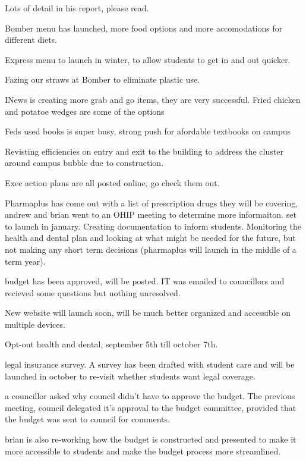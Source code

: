 \begin{information}

    Lots of detail in his report, please read. 
    
    Bomber menu has launched, more food options and more accomodations for
    different diets. 

    Express menu to launch in winter, to allow students to get in and out 
    quicker. 

    Fazing our straws at Bomber to eliminate plastic use. 

    INews is creating more grab and go items, they are very successful. Fried
    chicken and potatoe wedges are some of the options

    Feds used books is super busy, strong push for afordable textbooks on 
    campus

    Revisting efficiencies on entry and exit to the building to address the 
    cluster around campus bubble due to construction.

    Exec action plans are all posted online, go check them out. 

    Pharmaplus has come out with a list of prescription drugs they will be 
    covering, andrew and brian went to an OHIP meeting to determine more 
    informaiton.  set to launch in january. Creating documentation to 
    inform students. Monitoring the health and dental plan and looking 
    at what might be needed for the future, but not making any short term
    decisions (pharmaplus will launch in the middle of a term year). 

    budget has been approved, will be posted. IT was emailed to councillors
    and recieved some questions but nothing unresolved. 
    
    New website will launch soon, will be much better organized and accessible
    on multiple devices. 

    Opt-out health and dental, september 5th till october 7th. 

    legal insurance survey. A survey has been drafted with student care and
    will be launched in october to re-visit whether students want legal 
    coverage.

    a councillor asked why council didn't have to approve the budget. The 
    previous meeting, council delegated it's approval to the budget committee,
    provided that the budget was sent to council for comments.  

    brian is also re-working how the budget is constructed and presented to
    make it more accessible to students and make the budget process more 
    streamlined. 


\end{information}
